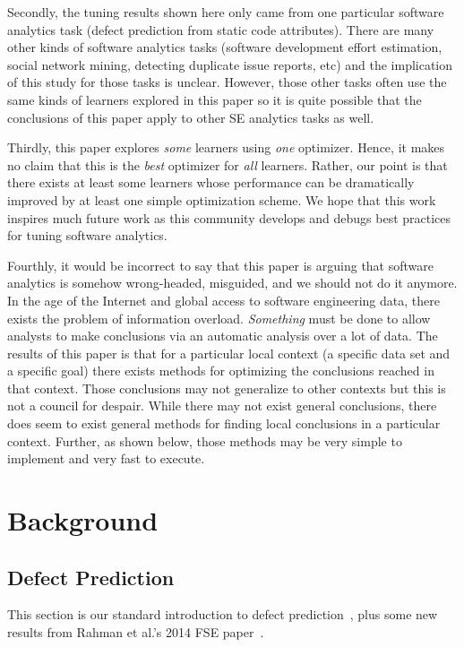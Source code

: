 \documentclass{sig-alternative}
\begin{document}
Secondly, the tuning results shown here only came from one particular software analytics task 
(defect prediction from static code attributes).
There are many other kinds of software analytics tasks 
(software development effort estimation, social network mining,
detecting duplicate issue reports, etc) and the implication of this
study for those tasks is unclear. 
However,  those other tasks often use the same kinds of learners
explored in this paper so it is quite possible that
the conclusions of this paper apply to other SE analytics tasks as well. 


Thirdly, this paper explores {\em some} learners using {\em one}  optimizer. Hence, it makes
no claim that this is the {\em best} optimizer for {\em all} learners.
Rather, our point is that there exists at least some learners
whose performance can be dramatically improved by 
at least one simple optimization scheme.  We hope that this work inspires
much future work as this community develops and debugs best practices for tuning
software analytics.

Fourthly, it would be incorrect to say that this paper is arguing that
software analytics is somehow wrong-headed, misguided, and we should not do it anymore.
In the age of the Internet and global access to software engineering data,
there exists the  problem of information overload. {\em Something} must be done to
allow analysts to make conclusions via an automatic analysis over a lot of data.
The results of this paper is that for a particular local context
(a specific data set and a specific goal) there exists  
methods for optimizing the conclusions reached in that context.  Those conclusions
may not generalize to other contexts but this  is not a council for despair. While there may
not exist general conclusions, there does seem to exist general methods for finding
local conclusions in a particular context. Further, as shown below, those
methods may be very simple to implement and very fast to execute.



\section{Background}
\subsection{Defect Prediction}


This section is our standard introduction to defect prediction~\cite{me15:book1},
plus   some new results from Rahman et al.'s   2014 FSE paper~\cite{rahman14:icse}. 
 
\end{document}
